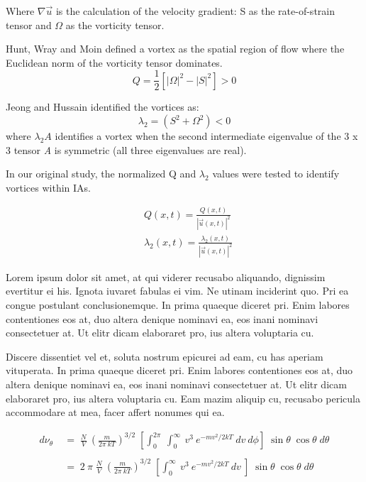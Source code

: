 Where $\nabla\vec{u}$ is the calculation of the velocity gradient: S as the rate-of-strain tensor and $\Omega$ as the vorticity tensor.

Hunt, Wray and Moin \cite{hunt1988eddies} defined a vortex as the spatial region of flow where  the Euclidean norm of the vorticity tensor dominates.
\begin{equation}
Q = \frac{1}{2}\left[|\Omega|^2 - |S|^2\right] > 0
\label{CHAPTER3_Q}
\end{equation}

Jeong and Hussain identified the vortices as:
\begin{equation}
\lambda_2 = (S^2 + \Omega^2) < 0
\label{CHAPTER3_lambda2}
\end{equation}
where $\lambda_2{A}$ identifies a vortex when the second intermediate eigenvalue of the 3 x 3 tensor \textit{A} is symmetric (all three eigenvalues are real). 

In our original study, the normalized Q and $\lambda_2$ values were tested to identify vortices within IAs.

\begin{equation}
\begin{aligned}
&Q(x,t) = \frac{Q(x,t)}{|\vec{u}(x,t)|^2} \\
&\lambda_2 (x,t) = \frac{\lambda_2 (x,t)}{|\vec{u}(x,t)|^2}
\end{aligned}
\label{CHAPTER3_normalized_Q_lambda2}
\end{equation}




Lorem ipsum dolor sit amet, at qui viderer recusabo aliquando, dignissim 
evertitur ei his. Ignota iuvaret fabulas ei vim. Ne utinam inciderint quo. 
Pri ea congue postulant conclusionemque. In prima quaeque diceret pri. Enim 
labores contentiones eos at, duo altera denique nominavi ea, eos inani 
nominavi consectetuer at. Ut elitr dicam elaboraret pro, ius altera 
voluptaria cu.

Discere dissentiet vel et, soluta nostrum epicurei ad eam, cu has aperiam 
vituperata. In prima quaeque diceret pri. Enim labores contentiones eos at, 
duo altera denique nominavi ea, eos inani nominavi consectetuer at. Ut elitr 
dicam elaboraret pro, ius altera voluptaria cu. Eam mazim aliquip cu, 
recusabo pericula accommodare at mea, facer affert nonumes qui ea.
\cite{LAPACK_00,FFTW3_00}

\begin{align*}
  d\nu_\theta &\;=\; \frac{N}{V}\:\left( \frac{m}{2\pi\:kT} \right)^{3/2}\;
                    \left[\int_{0}^{2\pi}\:\int_{0}^{\infty}\:v^3\:e^{-mv^2/2kT}\:dv\:d\phi \right]\;
                    \sin\theta\;\cos\theta\;d\theta \\\\
              &\;=\; 2\:\pi\;
                    \frac{N}{V}\:\left( \frac{m}{2\pi\:kT} \right)^{3/2}\;
                    \left[\int_{0}^{\infty}\:v^3\:e^{-mv^2/2kT}\:dv\: \right]\;
                    \sin\theta\;\cos\theta\;d\theta
\end{align*}

